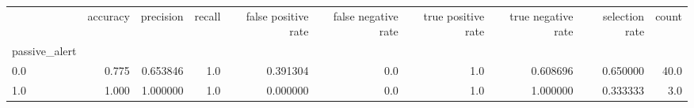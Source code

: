 \begin{tabular}{lrrrrrrrrr}
\toprule
{} &  accuracy &  precision &  recall &  false positive rate &  false negative rate &  true positive rate &  true negative rate &  selection rate &  count \\
passive\_alert &           &            &         &                      &                      &                     &                     &                 &        \\
\midrule
0.0           &     0.775 &   0.653846 &     1.0 &             0.391304 &                  0.0 &                 1.0 &            0.608696 &        0.650000 &   40.0 \\
1.0           &     1.000 &   1.000000 &     1.0 &             0.000000 &                  0.0 &                 1.0 &            1.000000 &        0.333333 &    3.0 \\
\bottomrule
\end{tabular}
